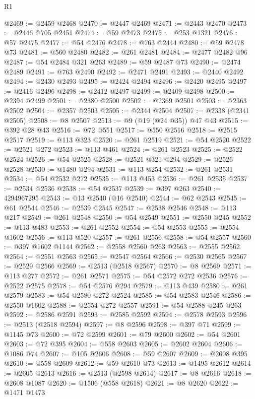 \begin{lexlean}{R1}
\begin{coremodule}
@2469 := @2459 @2468
@2470 := @2447 @2469
@2471 := @2443 @2470
@2473 := @2446 @705 @2451
@2474 := @59 @2473
@2475 := @253 @1321
@2476 := @57 @2475
@2477 := @54 @2476
@2478 := @763 @2444
@2480 := @59 @2478 @73
@2481 := @560 @2480
@2482 := @261 @2481
@2484 := @2477 @2482 @96
@2487 := @54 @2484 @321 @263
@2489 := @59 @2487 @73
@2490 := @2474 @2489
@2491 := @763 @2490
@2492 := @2471 @2491
@2493 := @2440 @2492
@2494 := @2430 @2493
@2495 := @2424 @2494
@2496 := @2420 @2495
@2497 := @2416 @2496
@2498 := @2412 @2497
@2499 := @2409 @2498
@2500 := @2394 @2499
@2501 := @2380 @2500
@2502 := @2369 @2501
@2503 := @2363 @2502
@2504 := @2357 @2503
@2505 := @2344 @2504
@2507 := @2338 (@2341 @2505)
@2508 := @8 @2507
@2513 := @9 (@19 (@24 @35)) @47 @43
@2515 := @392 @28 @43
@2516 := @72 @551
@2517 := @550 @2516
@2518 := @2515 @2517
@2519 := @113 @323
@2520 := @261 @2519
@2521 := @54 @2520
@2522 := @2521 @272
@2523 := @113 @461
@2524 := @261 @2523
@2525 := @2522 @2524
@2526 := @54 @2525
@2528 := @2521 @321 @294
@2529 := @2526 @2528
@2530 := @1480 @294
@2531 := @113 @254
@2532 := @261 @2531
@2534 := @54 @2532 @272
@2535 := @113 @453
@2536 := @261 @2535
@2537 := @2534 @2536
@2538 := @54 @2537
@2539 := @397 @263
@2540 := 4294967295
@2543 := @13 @2540 (@16 @2540)
@2544 := @62 @2543
@2545 := @61 @2544
@2546 := @2539 @2545
@2547 := @2538 @2546
@2548 := @113 @217
@2549 := @261 @2548
@2550 := @54 @2549
@2551 := @2550 @245
@2552 := @113 @483
@2553 := @261 @2552
@2554 := @54 @2553
@2555 := @2554 @1602
@2556 := @113 @520
@2557 := @261 @2556
@2558 := @54 @2557
@2560 := @397 @1602 @1144
@2562 := @2558 @2560 @263
@2563 := @2555 @2562
@2564 := @2551 @2563
@2565 := @2547 @2564
@2566 := @2530 @2565
@2567 := @2529 @2566
@2569 := @2513 (@2518 @2567)
@2570 := @8 @2569
@2571 := @113 @277
@2572 := @261 @2571
@2575 := @54 @2572 @272 @2536
@2576 := @2522 @2575
@2578 := @54 @2576 @294
@2579 := @113 @439
@2580 := @261 @2579
@2583 := @54 @2580 @272 @2524
@2585 := @54 @2583 @2546
@2586 := @2550 @1602
@2588 := @2554 @272 @2557
@2591 := @54 @2588 @245 @263
@2592 := @2586 @2591
@2593 := @2585 @2592
@2594 := @2578 @2593
@2596 := @2513 (@2518 @2594)
@2597 := @8 @2596
@2598 := @397 @71
@2599 := @1145 @73
@2600 := @72 @2599
@2601 := @79 @2600
@2602 := @54 @2601
@2603 := @72 @395
@2604 := @558 @2603
@2605 := @2602 @2604
@2606 := @1086 @74
@2607 := @105 @2606
@2608 := @59 @2607
@2609 := @2608 @395
@2610 := @558 @2609
@2612 := @59 @2610 @73
@2613 := @1495 @2612
@2614 := @2605 @2613
@2616 := @2513 (@2598 @2614)
@2617 := @8 @2616
@2618 := @2608 @1087
@2620 := @1506 (@558 @2618)
@2621 := @8 @2620
@2622 := @1471 @1473

\end{coremodule}
\end{lexlean}
